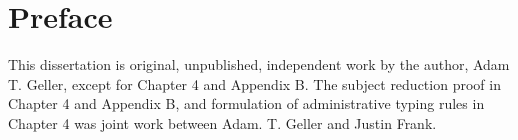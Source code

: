 \chapter{Preface}
This dissertation is original, unpublished, independent work by the author, Adam T. Geller, except for Chapter 4 and Appendix B.
The subject reduction proof in Chapter 4 and Appendix B, and formulation of administrative typing rules in Chapter 4 was joint work between Adam. T. Geller and Justin Frank.
